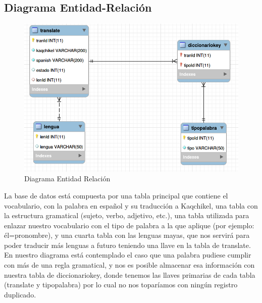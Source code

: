 \documentclass[a4paper,openright,11pt]{article}
\begin{document}
\subsection{Diagrama Entidad-Relación}
\begin{figure}[H]
	\centering
	\includegraphics[width=1.1\textwidth]{er}
	\caption{Diagrama Entidad Relación}
	\label{fig:er}
\end{figure}
La base de datos está compuesta por una tabla principal que contiene el vocabulario, con la palabra en español y su traducción a Kaqchikel, una tabla con la estructura gramatical (sujeto, verbo, adjetivo, etc.), una tabla utilizada para enlazar nuestro vocabulario con el tipo de palabra a la que aplique (por ejemplo: él=pronombre), y una cuarta tabla con las lenguas mayas, que nos servirá para poder traducir más lenguas a futuro teniendo una llave en la tabla de translate.\\
En nuestro diagrama está contemplado el caso que una palabra pudiese cumplir con más de una regla gramatical, y nos es posible almacenar esa información con nuestra tabla de diccionariokey, donde tenemos las llaves primarias de cada tabla (translate y tipopalabra) por lo cual no nos toparíamos con ningún registro duplicado.
\end{document}
